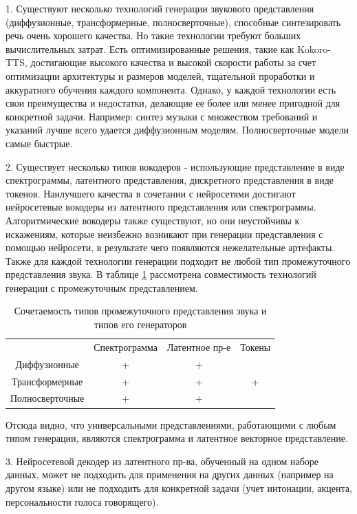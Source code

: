 1. Существуют несколько технологий генерации звукового представления (диффузионные, трансформерные, полносверточные), способные синтезировать речь очень хорошего качества. Но такие технологии требуют больших вычислительных затрат. 
Есть оптимизированные решения, такие как Kokoro-TTS, достигающие высокого качества и высокой скорости работы за счет оптимизации архитектуры и размеров моделей, тщательной проработки и аккуратного обучения каждого компонента. 
Однако, у каждой технологии есть свои преимущества и недостатки, делающие ее более или менее пригодной для конкретной задачи.
Например: синтез музыки с множеством требований и указаний лучше всего удается диффузионным моделям. Полносверточные модели самые быстрые. 

2. Существует несколько типов вокодеров - использующие представление в виде спектрограммы, латентного представления, дискретного представления в виде токенов. Наилучшего качества в сочетании с нейросетями достигают нейросетевые вокодеры из латентного представления или спектрограммы. 
Алгоритмические вокодеры также существуют, но они неустойчивы к искажениям, которые неизбежно возникают при генерации представления с помощью нейросети, в результате чего появляются нежелательные артефакты.
Также для каждой технологии генерации подходит не любой тип промежуточного представления звука. 
В таблице \ref{table:gen_type_feat_type} рассмотрена совместимость технологий генерации с промежуточным представлением.

\begin{table}[h!]
\centering
\begin{tabular}{ c c c c }
                 & Спектрограмма & Латентное пр-е & Токены \\
    Диффузионные & +             & +              &        \\ 
  Трансформерные & +             & +              & +      \\  
 Полносверточные & +             & +              &     
\end{tabular}
\caption{Сочетаемость типов промежуточного представления звука и типов его генераторов}
\label{table:gen_type_feat_type}
\end{table}

Отсюда видно, что универсальными представлениями, работающими с любым типом генерации, являются спектрограмма и латентное векторное представление. 

3. Нейросетевой декодер из латентного пр-ва, обученный на одном наборе данных, 
может не подходить для применения на других данных (например на другом языке) или 
не подходить для конкретной задачи (учет интонации, акцента, персональности голоса говорящего).

